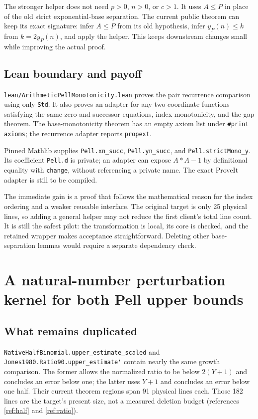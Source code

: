 \documentclass[11pt,a4paper]{article}
\newcommand{\code}[1]{\nolinkurl{#1}}
\begin{document}
The stronger helper does not need \(p>0\), \(n>0\), or \(c>1\).
It uses \(A\le P\) in place of the old strict exponential-base separation.
The current public theorem can keep its exact signature: infer \(A\le P\)
from its old hypothesis, infer \(y_P(n)\le k\) from \(k=2y_P(n)\), and apply
the helper. This keeps downstream changes small while improving the actual proof.

\subsection{Lean boundary and payoff}

\code{lean/ArithmeticPellMonotonicity.lean} proves the pair recurrence comparison
using only \code{Std}. It also proves an adapter for any two coordinate
functions satisfying the same zero and successor equations, index monotonicity,
and the gap theorem. The base-monotonicity theorem has an empty axiom list
under \texttt{\#print axioms}; the recurrence adapter reports \code{propext}.

Pinned Mathlib supplies \code{Pell.xn_succ}, \code{Pell.yn_succ}, and
\code{Pell.strictMono_y}. Its coefficient \code{Pell.d} is private; an adapter
can expose \(A*A-1\) by definitional equality with \code{change}, without
referencing a private name. The exact ProveIt adapter is still to be compiled.

The immediate gain is a proof that follows the mathematical reason for the
index ordering and a weaker reusable interface. The original target is only
25 physical lines, so adding a general helper may not reduce the first client's
total line count. It is still the safest pilot: the transformation is local,
its core is checked, and the retained wrapper makes acceptance straightforward.
Deleting other base-separation lemmas would require a separate dependency check.

\section{A natural-number perturbation kernel for both Pell upper bounds}
\label{sec:perturbation}

\subsection{What remains duplicated}

\code{NativeHalfBinomial.upper_estimate_scaled} and
\code{Jones1980.Ratio90.upper_estimate'} contain nearly the same
growth comparison. The former allows the normalized ratio to be below
\(2(Y+1)\) and concludes an error below one; the latter uses \(Y+1\) and
concludes an error below one half. Their current theorem regions span
91 physical lines each. Those 182 lines are the target's
present size, not a measured deletion budget (references \ref{ref:half} and
\ref{ref:ratio}).
\end{document}
